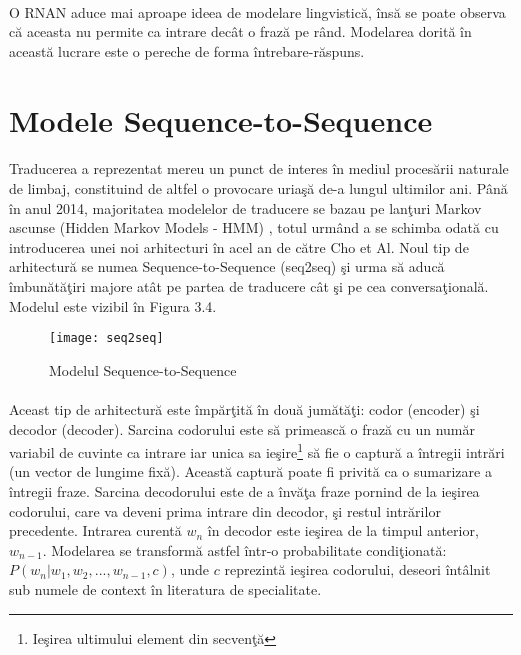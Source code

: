 \paragraph{}
O RNAN aduce mai aproape ideea de modelare lingvistic\u a, \^ ins\u a se poate observa c\u a aceasta nu permite ca intrare dec\^ at o fraz\u a pe r\^ and. Modelarea dorit\u a \^ in aceast\u a lucrare este o pereche de forma \^ intrebare-r\u aspuns.

\section{Modele Sequence-to-Sequence}

\paragraph{}
Traducerea a reprezentat mereu un punct de interes \^ in mediul proces\u arii naturale de limbaj, constituind de altfel o provocare uria\c s\u a de-a lungul ultimilor ani. P\^ an\u a \^ in anul 2014, majoritatea modelelor de traducere se bazau pe lan\c turi Markov ascunse (Hidden Markov Models - HMM) \cite{Rabiner:1990:THM:108235.108253}, totul urm\^ and a se schimba odat\u a cu introducerea unei noi arhitecturi \^ in acel an de c\u atre Cho et Al. Noul tip de arhitectur\u a se numea Sequence-to-Sequence (seq2seq) \cite{DBLP:journals/corr/SutskeverVL14} \c si urma s\u a aduc\u a \^ imbun\u at\u a\c tiri majore at\^ at pe partea de traducere c\^ at \c si pe cea conversa\c tional\u a. Modelul este vizibil \^ in Figura 3.4.

\begin{figure}[H]
\centering
\texttt{[image: seq2seq]}
\caption{Modelul Sequence-to-Sequence}
\end{figure}

\paragraph{}
Aceast tip de arhitectur\u a este \^ imp\u ar\c tit\u a \^ in dou\u a jum\u at\u a\c ti: codor (encoder) \c si decodor (decoder). Sarcina codorului este s\u a primeasc\u a o fraz\u a cu un num\u ar variabil de cuvinte ca intrare iar unica sa ie\c sire\footnote{Ie\c sirea ultimului element din secven\c t\u a} s\u a fie o captur\u a a \^ intregii intr\u ari (un vector de lungime fix\u a). Aceast\u a captur\u a poate fi privit\u a ca o sumarizare a \^ intregii fraze. Sarcina decodorului este de a \^ inv\u a\c ta fraze pornind de la ie\c sirea codorului, care va deveni prima intrare din decodor, \c si restul intr\u arilor precedente. Intrarea curent\u a \(w_{n}\) \^ in decodor este ie\c sirea de la timpul anterior, \(w_{n-1}\). Modelarea se transform\u a astfel \^ intr-o probabilitate condi\c tionat\u a: \(P(w_{n} | w_{1}, w_{2},..., w_{n-1}, c)\), unde \(c\) reprezint\u a ie\c sirea codorului, deseori \^ int\^ alnit sub numele de context \^ in literatura de specialitate.

